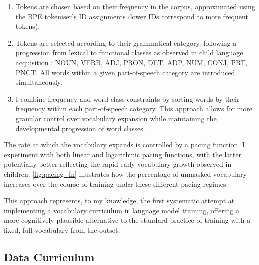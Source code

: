 \begin{enumerate}
    \item {} Tokens are chosen based on their frequency in the corpus, approximated using the BPE tokeniser's ID assignments (lower IDs correspond to more frequent tokens).
    
    \item {} Tokens are selected according to their grammatical category, following a progression from lexical to functional classes as observed in child language acquisition \citep{bergelson2015early}: NOUN, VERB, ADJ, PRON, DET, ADP, NUM, CONJ, PRT, PNCT. All words within a given part-of-speech category are introduced simultaneously.
    
    \item {} I combine frequency and word class constraints by sorting words by their frequency within each part-of-speech category. This approach allows for more granular control over vocabulary expansion while maintaining the developmental progression of word classes.
\end{enumerate}

The rate at which the vocabulary expands is controlled by a pacing function. I experiment with both linear and logarithmic pacing functions, with the latter potentially better reflecting the rapid early vocabulary growth observed in children. \cref{fig:pacing_fn} illustrates how the percentage of unmasked vocabulary increases over the course of training under these different pacing regimes.


This approach represents, to my knowledge, the first systematic attempt at implementing a vocabulary curriculum in language model training, offering a more cognitively plausible alternative to the standard practice of training with a fixed, full vocabulary from the outset.

\subsection{Data Curriculum}
\label{subsec:data-cl}

